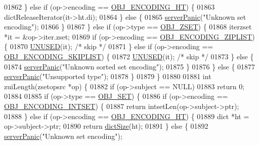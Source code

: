 \begin{DoxyCode}
01862         \} \textcolor{keywordflow}{else} \textcolor{keywordflow}{if} (op->encoding == \hyperlink{server_8h_a9c10219f68afc557d510d108257d238b}{OBJ\_ENCODING\_HT}) \{
01863             dictReleaseIterator(it->ht.di);
01864         \} \textcolor{keywordflow}{else} \{
01865             \hyperlink{server_8h_a11cc378e7778a830b41240578de3b204}{serverPanic}(\textcolor{stringliteral}{"Unknown set encoding"});
01866         \}
01867     \} \textcolor{keywordflow}{else} \textcolor{keywordflow}{if} (op->type == \hyperlink{server_8h_a8c356422ddbc03bd77694880a30a1953}{OBJ\_ZSET}) \{
01868         iterzset *it = &op->iter.zset;
01869         \textcolor{keywordflow}{if} (op->encoding == \hyperlink{server_8h_aabf064ede983103f1fd0df2086e84eee}{OBJ\_ENCODING\_ZIPLIST}) \{
01870             \hyperlink{server_8h_ae7c9dc8f13568a9c856573751f1ee1ec}{UNUSED}(it); \textcolor{comment}{/* skip */}
01871         \} \textcolor{keywordflow}{else} \textcolor{keywordflow}{if} (op->encoding == \hyperlink{server_8h_acfb35db5cb30ed113ed23aeb1a224c4c}{OBJ\_ENCODING\_SKIPLIST}) \{
01872             \hyperlink{server_8h_ae7c9dc8f13568a9c856573751f1ee1ec}{UNUSED}(it); \textcolor{comment}{/* skip */}
01873         \} \textcolor{keywordflow}{else} \{
01874             \hyperlink{server_8h_a11cc378e7778a830b41240578de3b204}{serverPanic}(\textcolor{stringliteral}{"Unknown sorted set encoding"});
01875         \}
01876     \} \textcolor{keywordflow}{else} \{
01877         \hyperlink{server_8h_a11cc378e7778a830b41240578de3b204}{serverPanic}(\textcolor{stringliteral}{"Unsupported type"});
01878     \}
01879 \}
01880 
01881 \textcolor{keywordtype}{int} zuiLength(zsetopsrc *op) \{
01882     \textcolor{keywordflow}{if} (op->subject == NULL)
01883         \textcolor{keywordflow}{return} 0;
01884 
01885     \textcolor{keywordflow}{if} (op->type == \hyperlink{server_8h_a8d179375a4aac33d3fa7aa80c8ccc75f}{OBJ\_SET}) \{
01886         \textcolor{keywordflow}{if} (op->encoding == \hyperlink{server_8h_a214173987de21c3b7661fddd42b05873}{OBJ\_ENCODING\_INTSET}) \{
01887             \textcolor{keywordflow}{return} intsetLen(op->subject->ptr);
01888         \} \textcolor{keywordflow}{else} \textcolor{keywordflow}{if} (op->encoding == \hyperlink{server_8h_a9c10219f68afc557d510d108257d238b}{OBJ\_ENCODING\_HT}) \{
01889             dict *ht = op->subject->ptr;
01890             \textcolor{keywordflow}{return} \hyperlink{dict_8h_af193430dd3d5579a52b194512f72c1f0}{dictSize}(ht);
01891         \} \textcolor{keywordflow}{else} \{
01892             \hyperlink{server_8h_a11cc378e7778a830b41240578de3b204}{serverPanic}(\textcolor{stringliteral}{"Unknown set encoding"});

\end{DoxyCode}
